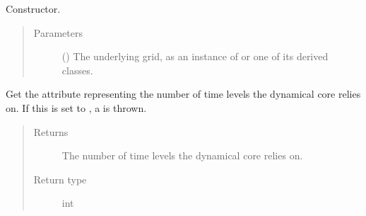 \documentclass[letterpaper,10pt,english]{sphinxmanual}
\begin{document}
\begin{fulllineitems}
\begin{fulllineitems}
\begin{quote}
\begin{description}
\begin{itemize}
\end{itemize}


\end{description}\end{quote}

\end{fulllineitems}


\begin{fulllineitems}
\label{\detokenize{api:parameterizations.adjustment.Adjustment.__init__}}
Constructor.
\begin{quote}\begin{description}
\item[{Parameters}] \leavevmode
{} () \textendash{} The underlying grid, as an instance of {\hyperref[\detokenize{api:grids.grid_xyz.GridXYZ}]{}} or one of its derived classes.

\end{description}\end{quote}

\end{fulllineitems}


\begin{fulllineitems}
\label{\detokenize{api:parameterizations.adjustment.Adjustment.time_levels}}
Get the attribute representing the number of time levels the dynamical core relies on.
If this is set to , a  is thrown.
\begin{quote}\begin{description}
\item[{Returns}] \leavevmode
The number of time levels the dynamical core relies on.

\item[{Return type}] \leavevmode
int

\end{description}\end{quote}

\end{fulllineitems}


\end{fulllineitems}
\end{document}
